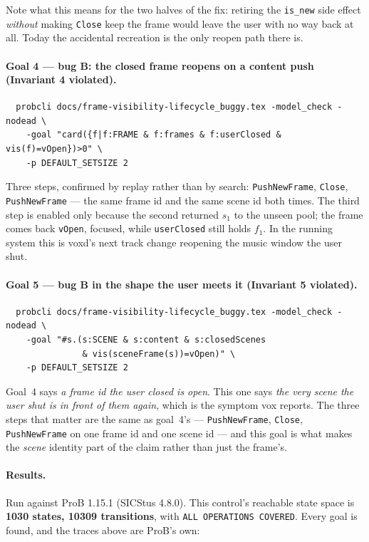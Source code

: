 \documentclass[a4paper,10pt,fleqn]{article}
\begin{document}
Note what this means for the two halves of the fix: retiring the
\texttt{is\_new} side effect \emph{without} making \texttt{Close} keep the
frame would leave the user with no way back at all.  Today the accidental
recreation is the only reopen path there is.

\paragraph{Goal 4 --- bug B: the closed frame reopens on a content push
(Invariant 4 violated).}
\begin{verbatim}
  probcli docs/frame-visibility-lifecycle_buggy.tex -model_check -nodead \
    -goal "card({f|f:FRAME & f:frames & f:userClosed & vis(f)=vOpen})>0" \
    -p DEFAULT_SETSIZE 2
\end{verbatim}
Three steps, confirmed by replay rather than by search:
\texttt{PushNewFrame}, \texttt{Close}, \texttt{PushNewFrame} --- the same
frame id and the same scene id both times.  The third step is enabled only
because the second returned $s_1$ to the unseen pool; the frame comes back
\texttt{vOpen}, focused, while \texttt{userClosed} still holds $f_1$.  In the
running system this is voxd's next track change reopening the music window the
user shut.

\paragraph{Goal 5 --- bug B in the shape the user meets it (Invariant 5
violated).}
\begin{verbatim}
  probcli docs/frame-visibility-lifecycle_buggy.tex -model_check -nodead \
    -goal "#s.(s:SCENE & s:content & s:closedScenes
               & vis(sceneFrame(s))=vOpen)" \
    -p DEFAULT_SETSIZE 2
\end{verbatim}
Goal~4 says \emph{a frame id the user closed is open}.  This one says
\emph{the very scene the user shut is in front of them again}, which is the
symptom vox reports.  The three steps that matter are the same as goal~4's ---
\texttt{PushNewFrame}, \texttt{Close}, \texttt{PushNewFrame} on one frame id
and one scene id --- and this goal is what makes the \emph{scene} identity part
of the claim rather than just the frame's.

\paragraph{Results.}  Run against ProB 1.15.1 (SICStus 4.8.0).  This control's
reachable state space is \textbf{1030 states, 10309 transitions}, with
\texttt{ALL OPERATIONS COVERED}.  Every goal is found, and the traces above
are ProB's own:
\end{document}
